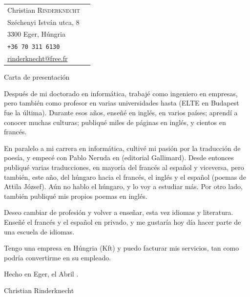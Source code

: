 \documentclass[a4paper,11pt]{article}
\begin{document}
\noindent
\begin{tabular}{@{}l@{\qquad\qquad\qquad}r@{}}
  Christian \textsc{Rinderknecht}
  & \\
  Széchenyi István utca, 8
  & \\
  3300 Eger, Húngria \\
  \texttt{+36 70 311 6130} \\
  \url{rinderknecht@free.fr}
\end{tabular}

\bigskip

\begin{center}
  \large Carta de presentación
\end{center}

\bigskip

Después de mi doctorado en informática, trabajé como ingeniero en
empresas, pero también como profesor en varias universidades hasta
 (ELTE en Budapest fue la última). Durante esos
años, enseñé en inglés, en varios países; aprendí a conocer muchas
culturas; publiqué miles de páginas en inglés, y cientos en francés.


En paralelo a mi carrera en informática, cultivé mi pasión por la
traducción de poesía, y empecé con Pablo Neruda en 
(editorial Gallimard). Desde entonces publiqué varias traducciones, en
mayoría del francés al español y viceversa, pero también, este año,
del húngaro hacia el francés, el inglés y el español (poemas de Attila
József). Aún no hablo el húngaro, y lo voy a estudiar más. Por otro
lado, también publiqué mis propios poemas en inglés.

Deseo cambiar de profesión y volver a enseñar, esta vez idiomas y
literatura. Enseñé el francés y el español en privado, y me gustaría
hoy día hacer parte de una escuela de idiomas.

Tengo una empresa en Húngria (Kft) y puedo facturar mis servicios, tan
como podría convertirme en su empleado.

\bigskip
\bigskip

\hfill Hecho en Eger, el  Abril .

\bigskip
\bigskip
\bigskip
\bigskip
\hfill Christian Rinderknecht

\bigskip
\end{document}
